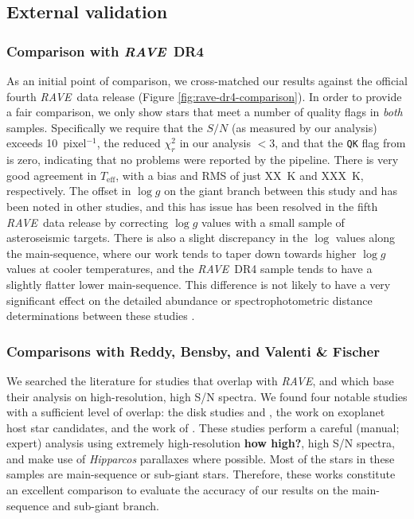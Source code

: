 \documentclass[preprint,trackchanges]{aastex}
\newcommand{\acronym}[1]{{\small{#1}}}
\newcommand{\project}[1]{\textsl{#1}}
\newcommand{\rave}{\project{\acronym{RAVE}}}
\newcommand{\stub}[1]{{\color{blue} \textbf{#1}}}
\newcommand{\teff}{T_{\mathrm{eff}}}
\newcommand{\logg}{\log g}
\begin{document}
\subsection{External validation}
\label{sec:external-validation}

\subsubsection{Comparison with \rave\ DR4}
\label{sec:validation-kordopatis}

As an initial point of comparison, we cross-matched our results against the 
official fourth \rave\ data release (Figure \ref{fig:rave-dr4-comparison}).
In order to provide a fair comparison, we only show stars that meet a number
of quality flags in \emph{both} samples. Specifically we require that the 
$S/N$ (as measured by our analysis) exceeds 10~pixel$^{-1}$, the reduced
$\chi_r^2$ in our analysis $< 3$, and that the \texttt{QK} flag from
\citet{Kordopatis_2013} is zero, indicating that no problems were reported by the pipeline.
There is very good agreement in $\teff$, with a bias and RMS of just XX~K 
and XXX~K, respectively.  The offset in $\logg$ on the giant branch between this study and 
\citet{Kordopatis_2013} has been noted in other studies, and this has issue
has been resolved in the fifth \rave\ data release by correcting $\logg$
values with a small sample of asteroseismic targets.  There is also a
slight discrepancy in the $\log$ values along the main-sequence, where our
work tends to taper down towards higher $\logg$ values at cooler temperatures,
and the \rave\ DR4 sample tends to have a slightly flatter lower main-sequence.
This difference is not likely to have a very significant effect on the detailed
abundance or spectrophotometric distance determinations between these studies 
\citep{Binney_2014}.


\subsubsection{Comparisons with Reddy, Bensby, and Valenti \& Fischer}
\label{sec:validation-gold-standards}

We searched the literature for studies that overlap with \rave, and which base
their analysis on high-resolution, high S/N spectra.  We found four notable
studies with a sufficient level of overlap: the disk studies \citet{Reddy_2003}
and \citet{Reddy_2006}, the \citet{Valenti_Fischer_2005} work on exoplanet
host star candidates, and the work of \citet{Bensby_2014}.  These studies 
perform a careful (manual; expert) analysis using extremely high-resolution
\stub{how high?}, high S/N spectra, and make use of \project{Hipparcos}
parallaxes where possible.  Most of the stars in these samples are main-sequence
or sub-giant stars.  Therefore, these works constitute an excellent comparison
to evaluate the accuracy of our results on the main-sequence and sub-giant branch.
\end{document}
